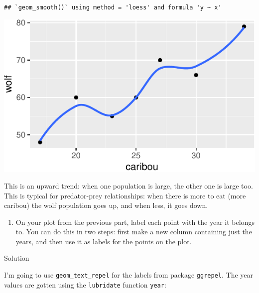 \documentclass[]{tufte-book}
\newenvironment{Shaded}{}{}
\newcommand{\DataTypeTok}[1]{\textcolor[rgb]{0.56,0.13,0.00}{#1}}
\newcommand{\KeywordTok}[1]{\textcolor[rgb]{0.00,0.44,0.13}{\textbf{#1}}}
\newcommand{\NormalTok}[1]{#1}
\newcommand{\OperatorTok}[1]{\textcolor[rgb]{0.40,0.40,0.40}{#1}}
\newcommand{\StringTok}[1]{\textcolor[rgb]{0.25,0.44,0.63}{#1}}
\providecommand{\tightlist}{%
  \setlength{\itemsep}{0pt}\setlength{\parskip}{0pt}}
\theoremstyle{definition}
\theoremstyle{definition}
\theoremstyle{definition}
\theoremstyle{remark}
\begin{document}
\begin{verbatim}
## `geom_smooth()` using method = 'loess' and formula 'y ~ x'
\end{verbatim}

\includegraphics{13-dates-and-times_files/figure-latex/unnamed-chunk-32-1}

This is an upward trend: when one population is large, the other one is
large too. This is typical for predator-prey relationships: when there
is more to eat (more caribou) the wolf population goes up, and when
less, it goes down.

\begin{enumerate}
\def\labelenumi{(\alph{enumi})}
\setcounter{enumi}{4}
\tightlist
\item
  On your plot from the previous part, label each point with the year it
  belongs to. You can do this in two steps: first make a new column
  containing just the years, and then use it as labels for the points on
  the plot.
\end{enumerate}

Solution

I'm going to use \texttt{geom\_text\_repel} for the labels from package
\texttt{ggrepel}. The year values are gotten using the
\texttt{lubridate} function \texttt{year}:

\begin{Shaded}
\end{Shaded}
\end{document}
